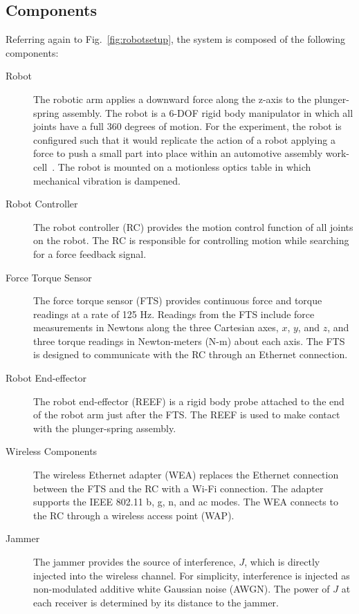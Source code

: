 \subsection{Components}

Referring again to Fig.~\ref{fig:robotsetup}, the system is composed of the following components:

\begin{description}
	\item[Robot] The robotic arm applies a downward force along the z-axis to the plunger-spring assembly.  The robot is a 6-DOF rigid body manipulator in which all joints have a full 360 degrees of motion.  For the experiment, the robot is configured such that it would replicate the action of a robot applying a force to push a small part into place within an automotive assembly work-cell~\cite{Cossio2012.RoboticsHandbook}.  The robot is mounted on a motionless optics table in which mechanical vibration is dampened.
	
	\item[Robot Controller] The robot controller (RC) provides the motion control function of all joints on the robot.  The RC is responsible for controlling motion while searching for a force feedback signal.
	
	\item[Force Torque Sensor] The force torque sensor (FTS) provides continuous force and torque readings at a rate of 125 Hz.  Readings from the FTS include force measurements in Newtons along the three Cartesian axes, $x$, $y$, and $z$, and three torque readings in Newton-meters (N-m) about each axis.  The FTS is designed to communicate with the RC through an Ethernet connection. 
	
	\item[Robot End-effector] The robot end-effector (REEF) is a rigid body probe attached to the end of the robot arm just after the FTS.  The REEF is used to make contact with the plunger-spring assembly.   
	
	\item[Wireless Components]  The wireless Ethernet adapter (WEA) replaces the Ethernet connection between the FTS and the RC with a Wi-Fi connection.  The adapter supports the IEEE 802.11 b, g, n, and ac modes. The WEA connects to the RC through a wireless access point (WAP).
	
	\item[Jammer] The jammer provides the source of interference, $J$, which is directly injected into the wireless channel.  For simplicity, interference is injected as non-modulated additive white Gaussian noise (AWGN).  The power of $J$ at each receiver is determined by its distance to the jammer.
	

\end{description}
